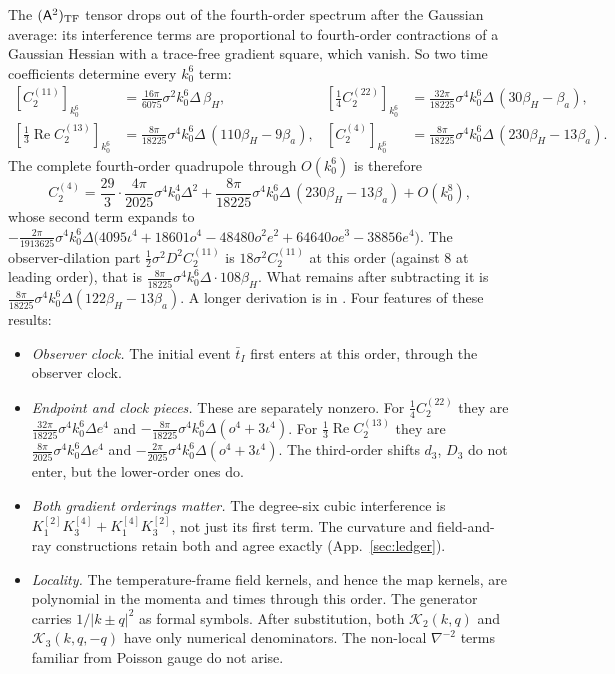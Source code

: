 \documentclass[11pt]{article}
\theoremstyle{definition}
\theoremstyle{remark}
\begin{document}
The $(\mathsf A^2)_{\rm TF}$ tensor drops out of the fourth-order spectrum after
the Gaussian average: its interference terms are proportional to fourth-order contractions of
a Gaussian Hessian with a trace-free gradient square, which vanish. So two time coefficients
determine every $k_0^6$ term:
\[
\boxed{\begin{aligned}
{}[C_2^{(11)}]_{k_0^6}&=\tfrac{16\pi}{6075}\sigma^2k_0^6\Delta\,\beta_H,&
[\tfrac14C_2^{(22)}]_{k_0^6}&=\tfrac{32\pi}{18225}\sigma^4k_0^6\Delta\,(30\beta_H-\beta_a),\\
[\tfrac13\operatorname{Re}C_2^{(13)}]_{k_0^6}&=\tfrac{8\pi}{18225}\sigma^4k_0^6\Delta\,(110\beta_H-9\beta_a),&
[C_2^{(4)}]_{k_0^6}&=\tfrac{8\pi}{18225}\sigma^4k_0^6\Delta\,(230\beta_H-13\beta_a).
\end{aligned}}
\]
The complete fourth-order quadrupole through $O(k_0^6)$ is therefore
\[
\boxed{C_2^{(4)}=\frac{29}{3}\cdot\frac{4\pi}{2025}\sigma^4k_0^4\Delta^2
+\frac{8\pi}{18225}\sigma^4k_0^6\Delta\,(230\beta_H-13\beta_a)+O(k_0^8),}
\]
whose second term expands to
$-\frac{2\pi}{1913625}\sigma^4k_0^6\Delta\big(4095\iota^4+18601o^4-48480o^2e^2+64640oe^3-38856e^4\big)$.
The observer-dilation part $\frac12\sigma^2D^2C^{(11)}_2$ is $18\sigma^2C^{(11)}_2$ at this order
(against $8$ at leading order), that is $\frac{8\pi}{18225}\sigma^4k_0^6\Delta\cdot108\beta_H$.
What remains after subtracting it is $\frac{8\pi}{18225}\sigma^4k_0^6\Delta(122\beta_H-13\beta_a)$.
A longer derivation is in .
Four features of these results:
\begin{itemize}
\item \emph{Observer clock.} The initial event $\bar t_I$ first enters at this order, through
  the observer clock.
\item \emph{Endpoint and clock pieces.} These are separately nonzero. For $\frac14C^{(22)}_2$
  they are $\frac{32\pi}{18225}\sigma^4k_0^6\Delta e^4$ and
  $-\frac{8\pi}{18225}\sigma^4k_0^6\Delta(o^4+3\iota^4)$. For $\frac13\operatorname{Re}C^{(13)}_2$ they
  are $\frac{8\pi}{2025}\sigma^4k_0^6\Delta e^4$ and $-\frac{2\pi}{2025}\sigma^4k_0^6\Delta(o^4+3\iota^4)$.
  The third-order shifts $d_3$, $D_3$ do not enter, but the lower-order ones do.
\item \emph{Both gradient orderings matter.} The degree-six cubic interference is
  $K_1^{[2]}K_3^{[4]}+K_1^{[4]}K_3^{[2]}$, not just its first term. The curvature and
  field-and-ray constructions retain both and agree exactly (App.~\ref{sec:ledger}).
\item \emph{Locality.} The temperature-frame field kernels, and hence the map kernels, are
  polynomial in the momenta and times through this order. The generator carries
  $1/|k\pm q|^2$ as formal symbols. After substitution, both $\mathcal K_2(k,q)$ and
  $\mathcal K_3(k,q,-q)$ have only numerical denominators. The non-local $\nabla^{-2}$ terms
  familiar from Poisson gauge do not arise.
\end{itemize}
\end{document}
